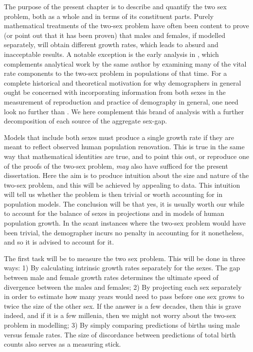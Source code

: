 \label{ch:Measuring}
The purpose of the present chapter is to describe and quantify the two sex
problem, both as a whole and in terms of its constituent parts. Purely
mathematical treatments of the two-sex problem have often been content to 
prove (or point out that it has been proven) that males and females,
if modelled separately, will obtain different growth rates, which leads to
absurd and inacceptable results. A notable exception is the early analysis in
\citet{karmel1948analysis}, which complements analytical work by the same author
\citep{karmel1947relations,karmel1948relations} by examining many of the vital
rate components to the two-sex problem in populations of that time. For a
complete historical and theoretical motivation for why demographers in general
ought be concerned with incorporating information from both sexes in the measurement of reproduction
and practice of demography in general, one need look no further than
\citet{francisco1996dissertation}. We here complement this brand of analysis
with a further decomposition of each source of the aggregate sex-gap.

Models that include both sexes must produce a single growth 
rate if they are meant to reflect observed human population renovation. 
This is true in the same way that mathematical identities are true, and to 
point this out, or reproduce one of the proofs of the two-sex problem, \textit{may} 
also have sufficed for the present dissertation. Here the aim is to produce intuition 
about the size and nature of the two-sex problem, and this will be
achieved by appealing to data. This intuition will tell us whether the 
problem is then trivial or worth accounting for in
population models. The conclusion will be that yes, it is usually worth our
while to account for the balance of sexes in projections and in models of human
population growth. In the scant instances where the two-sex problem would have
been trivial, the demographer incurs no penalty in accounting for it
nonetheless, and so it is advised to account for it.

The first task will be to measure the two sex problem. This will be done in
three ways: 1) By calculating intrinsic growth rates separately for the sexes.
The gap between male and female growth rates determines the ultimate speed of
divergence between the males and females; 2) By projecting each sex separately
in order to estimate how many years would need to pass before one sex grows to
twice the size of the other sex. If the answer is a few decades, then this is
grave indeed, and if it is a few millenia, then we might not worry about the
two-sex problem in modelling; 3) By simply comparing predictions of births using
male versus female rates. The size of discordance between predictions of total
birth counts also serves as a measuring stick.


